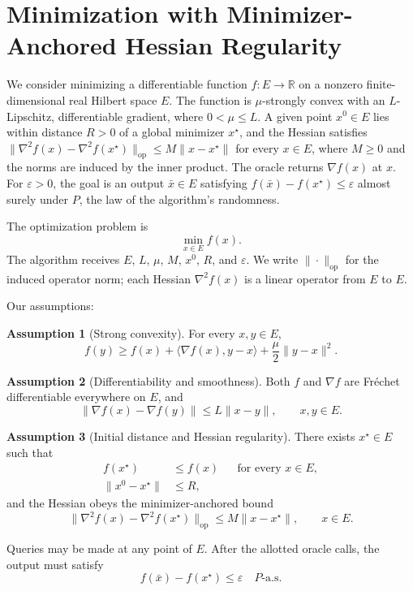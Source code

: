 \documentclass[10pt]{article}
\theoremstyle{definition}
\newtheorem{assumption}{Assumption}
\begin{document}
\section*{Minimization with Minimizer-Anchored Hessian Regularity}
We consider minimizing a differentiable function $f:E\to\mathbb{R}$ on a nonzero finite-dimensional real Hilbert space $E$. The function is $\mu$-strongly convex with an $L$-Lipschitz, differentiable gradient, where $0<\mu\leq L$. A given point $x^0\in E$ lies within distance $R>0$ of a global minimizer $x^\star$, and the Hessian satisfies $\|\nabla^2 f(x)-\nabla^2 f(x^\star)\|_{\mathrm{op}}\leq M\|x-x^\star\|$ for every $x\in E$, where $M\geq0$ and the norms are induced by the inner product. The oracle returns $\nabla f(x)$ at $x$. For $\varepsilon>0$, the goal is an output $\bar{x}\in E$ satisfying $f(\bar{x})-f(x^\star)\leq\varepsilon$ almost surely under $P$, the law of the algorithm's randomness.

The optimization problem is
\[
\min_{x\in E} f(x).
\]
The algorithm receives $E$, $L$, $\mu$, $M$, $x^0$, $R$, and $\varepsilon$. We write $\|\cdot\|_{\mathrm{op}}$ for the induced operator norm; each Hessian $\nabla^2 f(x)$ is a linear operator from $E$ to $E$.

Our assumptions:
\begin{assumption}[Strong convexity]
For every $x,y\in E$,
\[
f(y)\geq f(x)+\langle\nabla f(x),y-x\rangle
+\frac{\mu}{2}\|y-x\|^2.
\]
\end{assumption}

\begin{assumption}[Differentiability and smoothness]
Both $f$ and $\nabla f$ are Fr\'echet differentiable everywhere on $E$, and
\[
\|\nabla f(x)-\nabla f(y)\|\leq L\|x-y\|,
\qquad x,y\in E.
\]
\end{assumption}

\begin{assumption}[Initial distance and Hessian regularity]
There exists $x^\star\in E$ such that
\[
\begin{aligned}
f(x^\star)&\leq f(x) &&\text{for every }x\in E,\\
\|x^0-x^\star\|&\leq R,
\end{aligned}
\]
and the Hessian obeys the minimizer-anchored bound
\[
\|\nabla^2 f(x)-\nabla^2 f(x^\star)\|_{\mathrm{op}}
\leq M\|x-x^\star\|,
\qquad x\in E.
\]
\end{assumption}

Queries may be made at any point of $E$. After the allotted oracle calls, the output must satisfy
\[
f(\bar{x})-f(x^\star)\leq\varepsilon
\quad P\text{-a.s.}
\]
\end{document}
